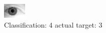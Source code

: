 \begin{figure}[h!]
\begin{center}
\includegraphics[width=0.60\columnwidth]{figures/ID2097_class_4_target_3.png}
\end{center}
\caption{ Classification: 4 actual target: 3}
\label{fig:ID2097_class_4_target_3}
\end{figure}
